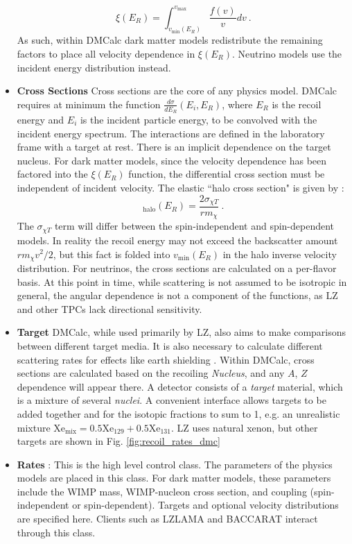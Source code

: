 \begin{itemize}
    \begin{equation}
        \xi(E_R) = \int_{v_{\text{min}}(E_R)}^{v_{\text{max}}} \frac{f(v)}{v}dv
        \label{eq:halo_function}~.
    \end{equation}
    \noindent
    As such, within DMCalc dark matter models redistribute the remaining factors to place all velocity dependence in $\xi(E_R)$.
    Neutrino models use the incident energy distribution instead.
    \item \textbf{Cross Sections}
    Cross sections are the core of any physics model.
    DMCalc requires at minimum the function $\frac{d \sigma}{d E_R}(E_i, E_R)$, where $E_R$ is the recoil energy and $E_i$ is the incident particle energy, to be convolved with the incident energy spectrum.
    The interactions are defined in the laboratory frame with a target at rest.
    There is an implicit dependence on the target nucleus.
    For dark matter models, since the velocity dependence has been factored into the $\xi(E_R)$ function, the differential cross section must be independent of incident velocity.
    The elastic ``halo cross section" is given by :
    \begin{equation}
        [\frac{d \sigma}{d E_R}]_{\text{halo}}(E_R) = \frac{2 \sigma_{\chi T}}{r m_\chi}  ~.
    \end{equation}
    \noindent
    The $\sigma_{\chi T}$ term will differ between the spin-independent and spin-dependent models.
    In reality the recoil energy may not exceed the backscatter amount $r m_\chi v^2/2$, but this fact is folded into $v_{\text{min}}(E_R)$ in the halo inverse velocity distribution.
    For neutrinos, the cross sections are calculated on a per-flavor basis.
    At this point in time, while scattering is not assumed to be isotropic in general, the angular dependence is not a component of the functions, as LZ and other TPCs lack directional sensitivity.
    
    \item \textbf{Target}
    DMCalc, while used primarily by LZ, also aims to make comparisons between different target media.
    It is also necessary to calculate different scattering rates for effects like earth shielding \cite{bramante_saturated_2018}.
    Within DMCalc, cross sections are calculated based on the recoiling \textit{Nucleus}, and any $A$, $Z$ dependence will appear there.
    A detector consists of a \textit{target} material, which is a mixture of several \textit{nuclei}.
    A convenient interface allows targets to be added together and for the isotopic fractions to sum to 1, e.g. an unrealistic mixture $\text{Xe}_{\text{mix}} = 0.5 \text{Xe}_{129} + 0.5 \text{Xe}_{131}$.
    LZ uses natural xenon, but other targets are shown in Fig. \ref{fig:recoil_rates_dmc}
    \item \textbf{Rates} : This is the high level control class.
    The parameters of the physics models are placed in this class. 
    For dark matter models, these parameters include the WIMP mass, WIMP-nucleon cross section, and coupling (spin-independent or spin-dependent).
    Targets and optional velocity distributions are specified here. 
    Clients such as LZLAMA and BACCARAT interact through this class.
\end{itemize}

